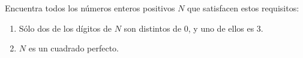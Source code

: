 Encuentra todos los números enteros positivos $N$ que satisfacen estos requisitos:
\begin{enumerate}
    \item  Sólo dos de los dígitos de $ N$ son distintos de $ 0$, y uno de ellos es $ 3$.
    \item  $N$ es un cuadrado perfecto.
\end{enumerate}
